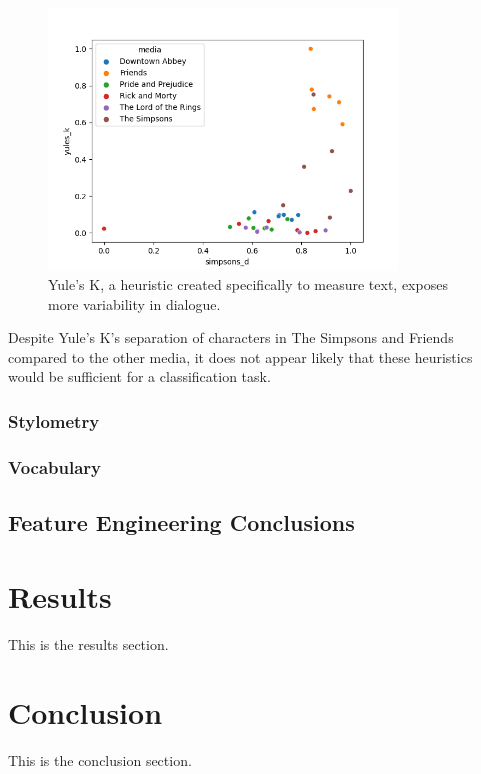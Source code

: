 \documentclass{article}
\newcommand{\largeimagewidth}{350}
\begin{document}
\begin{titlepage}
\begin{figure}[H]
\centering
\includegraphics[width=\largeimagewidth]{images/heuristics.png}
\caption{Yule's K, a heuristic created specifically to measure text, exposes more variability in dialogue.}
\end{figure}

Despite Yule's K's separation of characters in The Simpsons and Friends compared to the other media, it does not appear likely that these heuristics would be sufficient for a classification task.

\subsubsection{Stylometry}

\subsubsection{Vocabulary}
\subsection{Feature Engineering Conclusions}

\section{Results}
This is the results section.

\section{Conclusion}
This is the conclusion section.


\end{titlepage}
\end{document}
